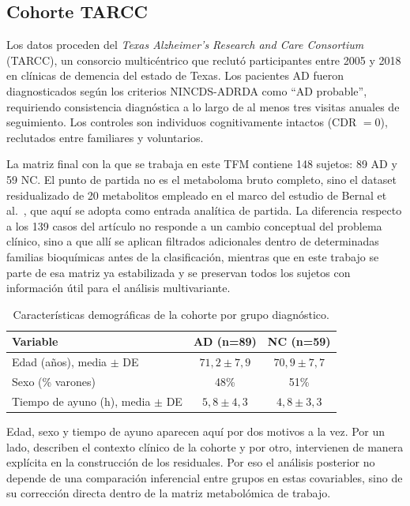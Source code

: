 \subsection{Cohorte TARCC}

Los datos proceden del \textit{Texas Alzheimer's Research and Care Consortium} (TARCC), un consorcio multicéntrico que
reclutó participantes entre 2005 y 2018 en clínicas de demencia del estado de Texas. Los pacientes AD fueron
diagnosticados según los criterios NINCDS-ADRDA como ``AD probable'', requiriendo consistencia diagnóstica a lo largo de
al menos tres visitas anuales de seguimiento. Los controles son individuos cognitivamente intactos (CDR $= 0$),
reclutados entre familiares y voluntarios.

La matriz final con la que se trabaja en este TFM contiene 148 sujetos: 89 AD y 59 NC. El punto de partida no es el
metaboloma bruto completo, sino el dataset residualizado de 20 metabolitos empleado en el marco del estudio de Bernal et
al.~\parencite{bernal2025metabolomics}, que aquí se adopta como entrada analítica de partida. La diferencia respecto a los 139 casos del artículo no
responde a un cambio conceptual del problema clínico, sino a que allí se aplican filtrados adicionales dentro de
determinadas familias bioquímicas antes de la clasificación, mientras que en este trabajo se parte de esa matriz ya
estabilizada y se preservan todos los sujetos con información útil para el análisis multivariante.

\begin{table}[ht]
\centering
\caption{Características demográficas de la cohorte por grupo diagnóstico.}
\label{tab:demografia}
\begin{tabular}{lcc}
\hline
\textbf{Variable} & \textbf{AD (n=89)} & \textbf{NC (n=59)} \\
\hline
Edad (años), media $\pm$ DE & $71{,}2 \pm 7{,}9$ & $70{,}9 \pm 7{,}7$ \\
Sexo (\% varones) & 48\% & 51\% \\
Tiempo de ayuno (h), media $\pm$ DE & $5{,}8 \pm 4{,}3$ & $4{,}8 \pm 3{,}3$ \\
\hline
\end{tabular}
\end{table}

Edad, sexo y tiempo de ayuno aparecen aquí por dos motivos a la vez. Por un lado, describen el contexto clínico de la
cohorte y por otro, intervienen de manera explícita en la construcción de los residuales. Por eso el análisis posterior
no depende de una comparación inferencial entre grupos en estas covariables, sino de su corrección directa dentro de la
matriz metabolómica de trabajo.

